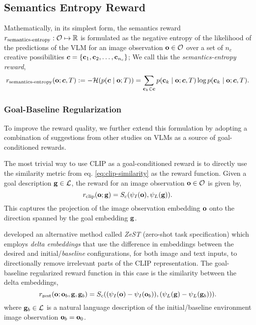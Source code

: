 \subsection{Semantics Entropy Reward}
\label{sec:entropy-reward}

Mathematically, in its simplest form, the semantics reward \(r_{\text{semantics-entropy}}: \mathcal{O} \mapsto \mathbb{R}\) is formulated as the negative entropy of the likelihood of the predictions of the VLM for an image observation \(\mathbf{o} \in \mathcal{O}\) over a set of \(n_c\) creative possibilities \(\bm{c} = \{ \mathbf{c}_1, \mathbf{c}_2, \ldots, \mathbf{c}_{n_c} \}\);
We call this the \emph{semantics-entropy reward},
\begin{equation}
    \label{eq:entropy-reward}
    r_{\text{semantics-entropy}}(\mathbf{o}; \bm{c}, T) := -\mathcal{H}(p(\bm{c} \mid \mathbf{o}; T)) = \sum_{\mathbf{c}_k \in \bm{c}} p(\mathbf{c}_k \mid \mathbf{o}; \bm{c}, T) \log p(\mathbf{c}_k \mid \mathbf{o}; \bm{c}, T).
\end{equation}
% 
\subsubsection{Goal-Baseline Regularization}
\label{sec:goal-baseline}
To improve the reward quality, we further extend this formulation by adopting a combination of suggestions from other studies on VLMs as a source of goal-conditioned rewards.

The most trivial way to use CLIP as a goal-conditioned reward is to directly use the similarity metric from eq. \eqref{eq:clip-similarity} as the reward function.
Given a goal description \(\mathbf{g} \in \mathcal{L}\), the reward for an image observation \(\mathbf{o} \in \mathcal{O}\) is given by,
\begin{equation}
    \label{eq:trivial-reward}
    r_{\text{clip}}(\mathbf{o}; \mathbf{g}) = S_c(\psi_I(\mathbf{o}), \psi_L(\mathbf{g})).
\end{equation}
This captures the projection of the image observation embedding \(\mathbf{o}\) onto the direction spanned by the goal embedding \(\mathbf{g}\).

\cite{zest} developed an alternative method called \emph{ZeST} (zero-shot task specification) which employs \emph{delta embeddings} that use the difference in embeddings between the desired and initial/\emph{baseline} configurations, for both image and text inputs, to directionally remove irrelevant parts of the CLIP representation.
The goal-baseline regularized reward function in this case is the similarity between the delta embeddings,
\begin{equation}
    \label{eq:zest}
    r_{\text{zest}}(\mathbf{o}; \mathbf{o}_b, \mathbf{g}, \mathbf{g}_b) = S_c((\psi_I(\mathbf{o}) - \psi_I(\mathbf{o}_b)), (\psi_L(\mathbf{g}) - \psi_L(\mathbf{g}_b))).
\end{equation}
where \(\mathbf{g}_b \in \mathcal{L}\) is a natural language description of the initial/baseline environment image observation \(\mathbf{o}_b = \mathbf{o}_0\).

